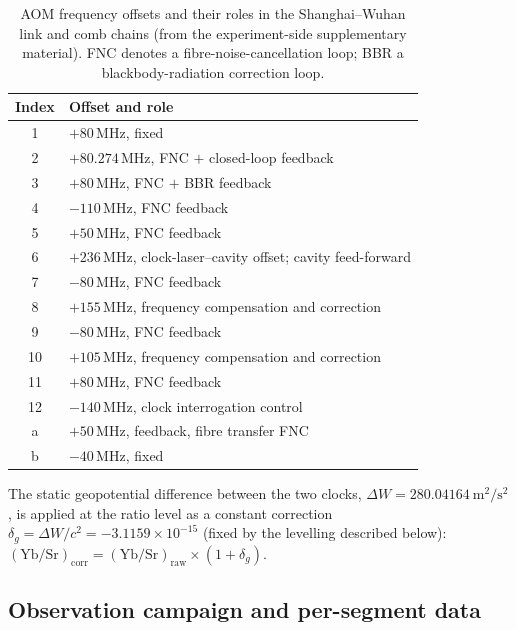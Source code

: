 \documentclass[11pt,a4paper]{article}
\newcommand{\dW}{\Delta W}
\newcommand{\e}[1]{\times 10^{#1}}
\begin{document}
\begin{table}[t]
  \centering
  \caption{AOM frequency offsets and their roles in the
  Shanghai--Wuhan link and comb chains (from the experiment-side
  supplementary material). FNC denotes a fibre-noise-cancellation loop;
  BBR a blackbody-radiation correction loop.}
  \label{tab:aom}
  \begin{tabular}{cl}
    \toprule
    Index & Offset and role \\
    \midrule
    1  & $+80$\,MHz, fixed \\
    2  & $+80.274$\,MHz, FNC $+$ closed-loop feedback \\
    3  & $+80$\,MHz, FNC $+$ BBR feedback \\
    4  & $-110$\,MHz, FNC feedback \\
    5  & $+50$\,MHz, FNC feedback \\
    6  & $+236$\,MHz, clock-laser--cavity offset; cavity feed-forward \\
    7  & $-80$\,MHz, FNC feedback \\
    8  & $+155$\,MHz, frequency compensation and correction \\
    9  & $-80$\,MHz, FNC feedback \\
    10 & $+105$\,MHz, frequency compensation and correction \\
    11 & $+80$\,MHz, FNC feedback \\
    12 & $-140$\,MHz, clock interrogation control \\
    a  & $+50$\,MHz, feedback, fibre transfer FNC \\
    b  & $-40$\,MHz, fixed \\
    \bottomrule
  \end{tabular}
\end{table}

The static geopotential difference between the two clocks,
$\dW = 280.04164\ \mathrm{m^{2}/s^{2}}$, is applied at the ratio level as a
constant correction $\delta_g = \dW/c^{2} = -3.1159\e{-15}$ (fixed by the
levelling described below):
$\mathrm{(Yb/Sr)}_{\mathrm{corr}} = \mathrm{(Yb/Sr)}_{\mathrm{raw}}
\times (1+\delta_g)$.



\subsection{Observation campaign and per-segment data}
\label{app:segments}
\end{document}
